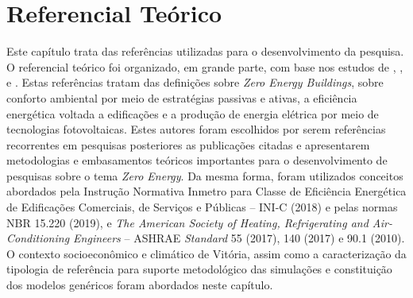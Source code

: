 \section{Referencial Teórico}
\begin{onehalfspace}
    Este capítulo trata das referências utilizadas para o desenvolvimento da 
    pesquisa. O referencial teórico foi organizado, em grande parte, com base 
    nos estudos de \textcite{Didone2014}, \textcite{Didone2014a}, 
    \textcite{Kurnitski2011a}  e \textcite{Torcellini2006}.  Estas  referências  tratam  
    das definições sobre \textit{Zero Energy Buildings}, sobre conforto ambiental por 
    meio de estratégias passivas e ativas, a eficiência energética voltada a 
    edificações e a produção de energia elétrica por meio de tecnologias 
    fotovoltaicas. Estes autores foram escolhidos por serem referências 
    recorrentes em pesquisas posteriores as publicações citadas e apresentarem 
    metodologias e embasamentos teóricos importantes para o desenvolvimento de 
    pesquisas sobre o tema \textit{Zero Energy}. Da mesma forma, foram utilizados 
    conceitos abordados pela Instrução Normativa Inmetro para Classe de 
    Eficiência Energética de Edificações Comerciais, de Serviços e Públicas 
    – INI-C (2018) e pelas  normas  NBR  15.220  (2019),  e \textit{The American 
    Society of Heating, Refrigerating and Air-Conditioning 
    Engineers} – ASHRAE \textit{Standard} 55 (2017), 140 (2017) e 90.1 (2010). 
    O contexto socioeconômico e climático de Vitória, assim como a caracterização 
    da tipologia de referência  para  suporte  metodológico  das  simulações  
    e  constituição  dos  modelos  genéricos foram abordados neste capítulo.




\end{onehalfspace}